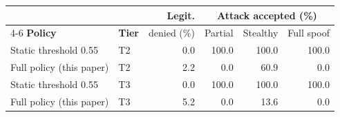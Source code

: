 \begin{tabular}{@{}llrrrr@{}}
\toprule
& & Legit. & \multicolumn{3}{c}{Attack accepted (\%)} \\
\cmidrule(lr){4-6}
\textbf{Policy} & \textbf{Tier} & denied (\%) & Partial & Stealthy & Full spoof \\
\midrule
Static threshold 0.55 & T2 & 0.0 & 100.0 & 100.0 & 100.0 \\
Full policy (this paper) & T2 & 2.2 & 0.0 & 60.9 & 0.0 \\
Static threshold 0.55 & T3 & 0.0 & 100.0 & 100.0 & 100.0 \\
Full policy (this paper) & T3 & 5.2 & 0.0 & 13.6 & 0.0 \\
\bottomrule
\end{tabular}
